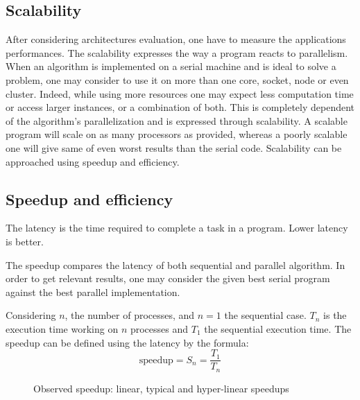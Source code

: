 \subsection{Scalability}

After considering architectures evaluation, one have to measure the applications performances.
The scalability expresses the way a program reacts to parallelism. 
When an algorithm is implemented on a serial machine and is ideal to solve a problem, one may consider to use it on more than one core, socket, node or even cluster. 
Indeed, while using more resources one may expect less computation time or access larger instances, or a combination of both. 
This is completely dependent of the algorithm's parallelization and is expressed through scalability. 
A scalable program will scale on as many processors as provided, whereas a poorly scalable one will give same of even worst results than the serial code.  
Scalability can be approached using speedup and efficiency.

\subsection{Speedup and efficiency}
The latency is the time required to complete a task in a program.
Lower latency is better. 

The speedup compares the latency of both sequential and parallel algorithm. 
In order to get relevant results, one may consider the given best serial program against the best parallel implementation.

Considering $n$, the number of processes, and $n=1$ the sequential case.
$T_n$ is the execution time working on $n$ processes and $T_1$ the sequential execution time. 
The speedup can be defined using the latency by the formula: 
\begin{equation}
\text{speedup} = S_n =  \frac{T_1}{T_n}
\end{equation}

\begin{figure}
\centering 
{}
\caption{Observed speedup: linear, typical and hyper-linear speedups}
\label{fig:1_HPC:speedup_obs}
\end{figure}


